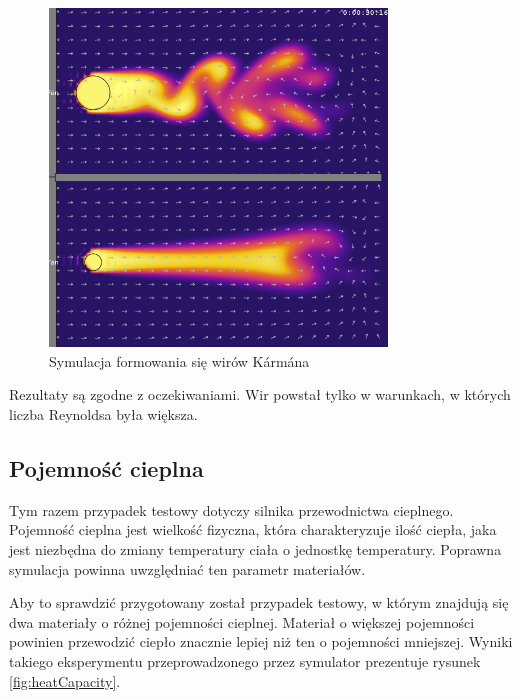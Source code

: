 \begin{figure}[!h]
\centering
\includegraphics[width=0.8\textwidth]{img/physics/karman}
\caption{Symulacja formowania się wirów Kármána}
\label{fig:physKarman}
\end{figure}

Rezultaty są zgodne z oczekiwaniami. Wir powstał tylko w warunkach, w których
liczba Reynoldsa była większa.

\subsection{Pojemność cieplna}

Tym razem przypadek testowy dotyczy silnika przewodnictwa cieplnego. Pojemność
cieplna jest wielkość fizyczna, która charakteryzuje ilość ciepła, jaka jest
niezbędna do zmiany temperatury ciała o jednostkę temperatury. Poprawna
symulacja powinna uwzględniać ten parametr materiałów.

Aby to sprawdzić przygotowany został przypadek testowy, w którym znajdują się
dwa materiały o różnej pojemności cieplnej. Materiał o większej pojemności
powinien przewodzić ciepło znacznie lepiej niż ten o pojemności mniejszej.
Wyniki takiego eksperymentu przeprowadzonego przez symulator \en prezentuje
rysunek \ref{fig:heatCapacity}.

